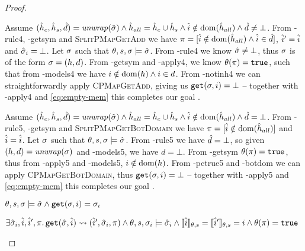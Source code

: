 \begin{proof}

\begin{hypvlist}
 Assume $(\hat{h}_c,\hat{h}_s,\hat{d})=\mathit{unwrap}(\hat{\sigma}) \land \hat{h}_{all}=\hat{h}_c\cup \hat{h}_s \land \hat{i}\notin\operatorname{dom}(\hat{h}_{all}) \land \hat{d}\neq\bot$.
 From \hyp{rule4}, \hyp{getsym} and \textsc{SplitPMapGetAdd} we have $\pi=[\hat{i}\notin\operatorname{dom}(\hat{h}_{all}) \land \hat{i}\in \hat{d}]$, $\hat{i}'=\hat{i}$ and $\hat{\sigma}_i=\bot$.
 Let $\sigma$ such that $\theta,s,\sigma\models\hat{\sigma}$.
 From \hyp{rule4} we know $\hat{\sigma}\neq\bot$, thus $\sigma$ is of the form $\sigma=(h,d)$.
 From \hyp{getsym} and \hyp{apply4}, we know $\theta(\pi)=\texttt{true}$, such that from \hyp{models4} we have ${i\notin \operatorname{dom}(h)} \land {i\in d}$.
 From \hyp{notinh4} we can straightforwardly apply \textsc{CPMapGetAdd}, giving us $\texttt{get}(\sigma,i)=\bot$ -- together with \hyp{apply4} and \ref{eq:empty-mem} this completes our goal .
\end{hypvlist}


\begin{hypvlist}
 Assume $(\hat{h}_c,\hat{h}_s,\hat{d})=\mathit{unwrap}(\hat{\sigma}) \land \hat{h}_{all}=\hat{h}_c\cup \hat{h}_s \land \hat{i}\notin \operatorname{dom}(\hat{h}_{all}) \land \hat{d}=\bot$.
 From \hyp{rule5}, \hyp{getsym} and \textsc{SplitPMapGetBotDomain} we have $\pi=[\hat{i}\notin\operatorname{dom}(\hat{h}_{all})]$ and $\hat{i}=\hat{i}$.
 Let $\sigma$ such that $\theta,s,\sigma\models\hat{\sigma}$.
 From \hyp{rule5} we have $\hat{d}=\bot$, so given $(h,d)={\operatorname{\mathit{unwrap}}}(\sigma)$ and \hyp{models5}, we have $d=\bot$.%
 From \hyp{getsym} $\theta(\pi)=\texttt{true}$, thus from \hyp{apply5} and \hyp{models5}, $i\notin \operatorname{dom}(h)$.
 From \hyp{pctrue5} and \hyp{botdom} we can apply \textsc{CPMapGetBotDomain}, thus ${\texttt{get}(\sigma,i)=\bot}$ -- together with \hyp{apply5} and \ref{eq:empty-mem} this completes our goal .
\end{hypvlist}


\pfassume \begin{hypvlist}
 $\theta,s,\sigma \models \hat{\sigma} \land \texttt{get}(\sigma, i)=\sigma_i$
\end{hypvlist}
\pfprove \begin{goalvlist}
 $\exists \hat{\sigma}_i, \hat{i}, \hat{i}', \pi \ldotp \texttt{get}(\hat{\sigma},\hat{i})\rightsquigarrow(\hat{i}', \hat{\sigma}_i, \pi) \land \theta,s,\sigma_i\models\hat{\sigma}_i \land \llbracket\hat{i}\rrbracket_{\theta,s}=\llbracket\hat{i}'\rrbracket_{\theta,s}=i \land \theta(\pi)=\texttt{true}$
\end{goalvlist}


\end{proof}
